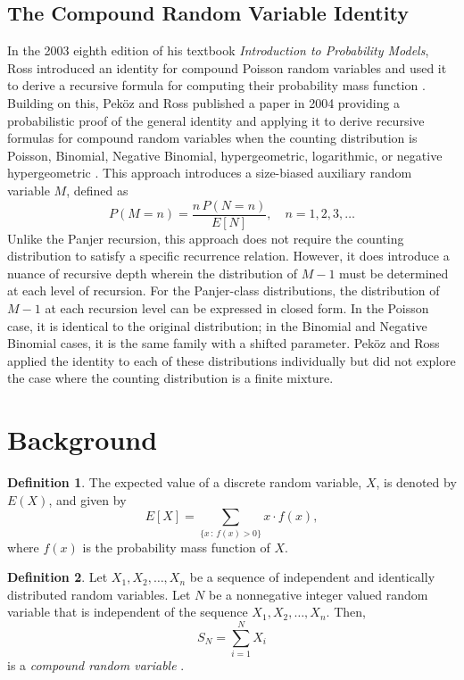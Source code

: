 \documentclass[11pt]{amsart}
\theoremstyle{definition}
\newtheorem{definition}{Definition}
\theoremstyle{plain}
\begin{document}
\subsection{The Compound Random Variable Identity}

In the 2003 eighth edition of his textbook \emph{Introduction to Probability Models}, Ross
introduced an identity for compound Poisson random variables and used it to derive a
recursive formula for computing their probability mass function \cite{ross2010}. Building on
this, Pek\"{o}z and Ross published a paper in 2004 providing a probabilistic proof of the
general identity and applying it to derive recursive formulas for compound random variables
when the counting distribution is Poisson, Binomial, Negative Binomial, hypergeometric,
logarithmic, or negative hypergeometric \cite{pekoz-ross}. This approach introduces a
size-biased auxiliary random variable $M$, defined as
\[
    P(M = n) = \frac{n\, P(N = n)}{E[N]}, \quad n = 1, 2, 3, \ldots
\]
Unlike the Panjer recursion, this approach does not require the counting distribution to
satisfy a specific recurrence relation. However, it does introduce a nuance of recursive
depth wherein the distribution of $M - 1$ must be determined at each level of recursion. For
the Panjer-class distributions, the distribution of $M - 1$ at each recursion level can be
expressed in closed form. In the Poisson case, it is identical to the original distribution; in
the Binomial and Negative Binomial cases, it is the same family with a shifted parameter.
Pek\"{o}z and Ross applied the identity to each of these distributions individually but did not
explore the case where the counting distribution is a finite mixture.

\section{Background}

\begin{definition}
The expected value of a discrete random variable, $X$, is denoted by $E(X)$, and given by
\[
    E[X] = \sum_{\{x\,:\,f(x)>0\}} x \cdot f(x),
\]
where $f(x)$ is the probability mass function of $X$.
\end{definition}

\begin{definition}
Let $X_1, X_2, \ldots, X_n$ be a sequence of independent and identically distributed random
variables.  Let $N$ be a nonnegative integer valued random variable that is independent of
the sequence $X_1, X_2, \ldots, X_n$.  Then,
\[
    S_N = \sum_{i=1}^{N} X_i
\]
is a \emph{compound random variable} \cite{ross2010}.
\end{definition}
\end{document}

